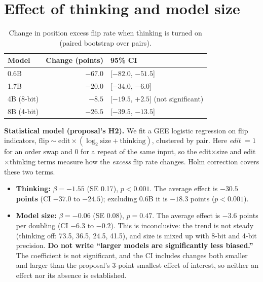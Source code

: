 \documentclass[10.5pt]{article}
\begin{document}
\section{Effect of thinking and model size}
\begin{table}[H]
\centering\small
\caption{Change in position excess flip rate when thinking is turned on (paired bootstrap over pairs).}
\begin{tabular}{lrl}
\toprule
Model & Change (points) & 95\% CI \\
\midrule
0.6B & $-67.0$ & [$-82.0$, $-51.5$] \\
1.7B & $-20.0$ & [$-34.0$, $-6.0$] \\
4B (8-bit) & $-8.5$ & [$-19.5$, $+2.5$] (not significant) \\
8B (4-bit) & $-26.5$ & [$-39.5$, $-13.5$] \\
\bottomrule
\end{tabular}
\end{table}
\textbf{Statistical model (proposal's H2).} We fit a GEE logistic regression on flip indicators,
$\text{flip} \sim \text{edit} \times (\log_2\text{size} + \text{thinking})$, clustered by pair. Here
\emph{edit} $=1$ for an order swap and $0$ for a repeat of the same input, so the edit$\times$size and
edit$\times$thinking terms measure how the \emph{excess} flip rate changes. Holm correction covers these two
terms.
\begin{itemize}
\item \textbf{Thinking:} $\beta=-1.55$ (SE 0.17), $p<0.001$. The average effect is \textbf{$-30.5$ points} (CI
$-37.0$ to $-24.5$); excluding 0.6B it is $-18.3$ points ($p<0.001$).
\item \textbf{Model size:} $\beta=-0.06$ (SE 0.08), $p=0.47$. The average effect is $-3.6$ points per doubling (CI
$-6.3$ to $-0.2$). This is inconclusive: the trend is not steady (thinking off: 73.5, 36.5, 24.5, 41.5), and size
is mixed up with 8-bit and 4-bit precision. \textbf{Do not write ``larger models are significantly less
biased.''} The coefficient is not significant, and the CI includes changes both smaller and larger than the
proposal's 3-point smallest effect of interest, so neither an effect nor its absence is established.
\end{itemize}
\end{document}
